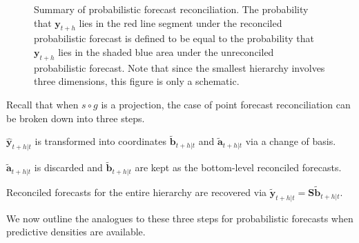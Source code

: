 \documentclass[a4paper, 11pt]{article}
\theoremstyle{definition}
\begin{document}
\begin{figure}
	
	\caption{Summary of probabilistic forecast reconciliation. The probability that $\bm{y}_{t+h}$ lies in the red line segment under the reconciled probabilistic forecast is defined to be equal to the probability that $\bm{y}_{t+h}$ lies in the shaded blue area under the unreconciled probabilistic forecast. Note that since the smallest hierarchy involves three dimensions, this figure is only a schematic.}\label{fig:probfr_sch}
\end{figure}

Recall that when $s\circ g$ is a projection, the case of point forecast reconciliation can be broken down into three steps.
\begin{compactenum}
\item  $\hat{\bm{y}}_{t+h|t}$ is transformed into coordinates $\tilde{\bm{b}}_{t+h|t}$ and $\tilde{\bm{a}}_{t+h|t}$ via a change of basis.
\item $\tilde{\bm{a}}_{t+h|t}$ is discarded and $\tilde{\bm{b}}_{t+h|t}$ are kept as the bottom-level reconciled forecasts.
\item Reconciled forecasts for the entire hierarchy are recovered via $\tilde{\bm{y}}_{t+h|t}=\bm{S}\tilde{\bm{b}}_{t+h|t}$.
\end{compactenum}
We now outline the analogues to these three steps for probabilistic forecasts when predictive densities are available.
\end{document}

